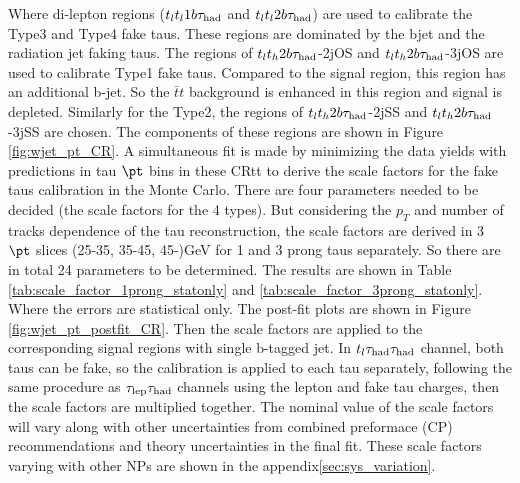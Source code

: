 %
%

Where di-lepton regions ($t_lt_l1b\tau_\text{had}$ and $t_lt_l2b\tau_\text{had}$) are used to calibrate the Type3 and Type4 fake taus. These regions are dominated by the bjet and the radiation jet faking taus. The regions of
$t_lt_h2b\tau_\text{had}$-2jOS and $t_lt_h2b\tau_\text{had}$-3jOS are used to calibrate Type1 fake taus. Compared to the signal region, this region has an additional b-jet. So the $\bar{t}t$ background is enhanced in this region and signal is depleted. Similarly for the Type2, the regions of $t_lt_h2b\tau_\text{had}$-2jSS and $t_lt_h2b\tau_\text{had}$-3jSS are chosen. The components of these regions are shown in Figure \ref{fig:wjet_pt_CR}. 
A simultaneous fit is made by minimizing the data yields with predictions in tau $\pt$ bins in these CRtt to derive the scale factors for the fake taus calibration in the Monte Carlo.
There are four parameters needed to be decided (the scale factors for the 4 types). But considering the $p_{T}$ and number of tracks dependence of the tau reconstruction, the scale factors are derived in 3 $\pt$ slices (25-35, 35-45, 45-)GeV for 1 and 3 prong taus separately. So there are in total 24 parameters to be determined. The results are shown in Table \ref{tab:scale_factor_1prong_statonly} and \ref{tab:scale_factor_3prong_statonly}. Where the errors are statistical only. The post-fit plots are shown in Figure \ref{fig:wjet_pt_postfit_CR}. Then the scale factors are applied to the corresponding signal regions with single b-tagged jet. In $t_l\tau_\text{had}{}\tau_\text{had}$ channel, both taus can be fake, so the calibration is applied to each tau separately, following the same procedure as $\tau_\text{lep}{}\tau_\text{had}$ channels using the lepton and fake tau charges, then the scale factors are multiplied together. The nominal value of the scale factors will vary along with other uncertainties from combined preformace (CP) recommendations and theory uncertainties in the final fit. These scale factors varying with other NPs are shown in the appendix\ref{sec:sys_variation}.




